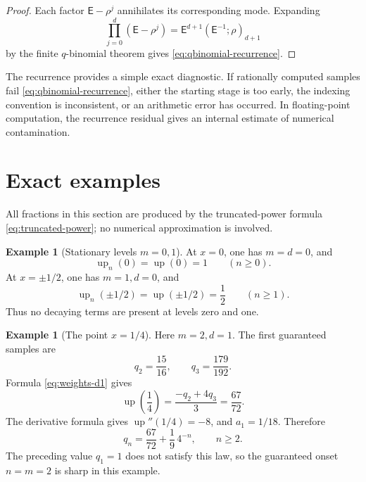 \documentclass[11pt,oneside]{article}
\theoremstyle{definition}
\newtheorem{example}[theorem]{Example}
\theoremstyle{remark}
\newcommand{\up}{\operatorname{up}}
\newcommand{\E}{\mathsf E}
\begin{document}
\begin{proof}
Each factor \(\E-\rho^j\) annihilates its corresponding mode.  Expanding
\[
 \prod_{j=0}^{d}(\E-\rho^j)
 =\E^{d+1}(\E^{-1};\rho)_{d+1}
\]
by the finite \(q\)-binomial theorem gives
\eqref{eq:qbinomial-recurrence}.
\end{proof}

The recurrence provides a simple exact diagnostic.  If rationally computed
samples fail \eqref{eq:qbinomial-recurrence}, either the starting stage is too
early, the indexing convention is inconsistent, or an arithmetic error has
occurred.  In floating-point computation, the recurrence residual gives an
internal estimate of numerical contamination.

\section{Exact examples}

All fractions in this section are produced by the truncated-power formula
\eqref{eq:truncated-power}; no numerical approximation is involved.

\begin{example}[Stationary levels \(m=0,1\)]
At \(x=0\), one has \(m=d=0\), and
\[
 \up_n(0)=\up(0)=1\qquad(n\ge0).
\]
At \(x=\pm1/2\), one has \(m=1,d=0\), and
\[
 \up_n(\pm1/2)=\up(\pm1/2)=\frac12\qquad(n\ge1).
\]
Thus no decaying terms are present at levels zero and one.
\end{example}

\begin{example}[The point \(x=1/4\)]\label{ex:quarter}
Here \(m=2,d=1\).  The first guaranteed samples are
\begin{equation}\label{eq:quarter-samples}
 q_2=\frac{15}{16},
 \qquad
 q_3=\frac{179}{192}.
\end{equation}
Formula \eqref{eq:weights-d1} gives
\begin{equation}\label{eq:quarter-value}
 \up\!\left(\frac14\right)
 =\frac{-q_2+4q_3}{3}
 =\frac{67}{72}.
\end{equation}
The derivative formula gives \(\up''(1/4)=-8\), and \(a_1=1/18\).  Therefore
\begin{equation}\label{eq:quarter-law}
 \boxed{\displaystyle
 q_n=\frac{67}{72}+\frac19\,4^{-n},\qquad n\ge2.}
\end{equation}
The preceding value \(q_1=1\) does not satisfy this law, so the guaranteed
onset \(n=m=2\) is sharp in this example.
\end{example}
\end{document}
